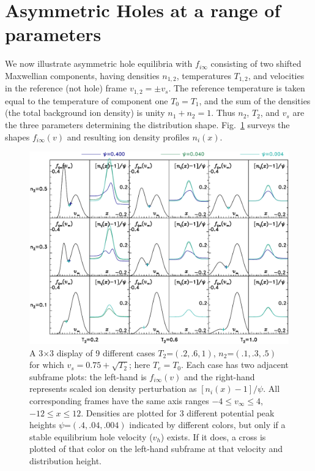 \documentclass[12pt]{article}
\begin{document}
\section{Asymmetric Holes at a range of parameters}

We now illustrate asymmetric hole equilibria with $f_{i\infty}$
consisting of two shifted Maxwellian components, having densities
$n_{1,2}$, temperatures $T_{1,2}$, and velocities in the reference
(not hole) frame $v_{1,2}=\pm v_s$. The reference temperature is taken
equal to the temperature of component one $T_0=T_1$, and the sum of
the densities (the total background ion density) is unity
$n_1+n_2=1$. Thus $n_2$, $T_2$, and $v_s$ are the three parameters
determining the distribution shape. Fig.\ \ref{fig:multiden} surveys
the shapes $f_{i\infty}(v)$ and resulting ion density profiles
$n_i(x)$.
\begin{figure}[htp]
  \centering
  \includegraphics[width=.9\hsize]{multiden}
  \caption{A 3$\times$3 display of 9 different cases
    $T_2$=$(.2,.6,1)$, $n_2$=$(.1,.3,.5)$ for which
    $v_s=0.75+\sqrt{T_2}$; here $T_e=T_0$. Each case has two adjacent
    subframe plots: the left-hand is $f_{i\infty}(v)$ and the
    right-hand represents scaled ion density perturbation as
    $[n_i(x)-1]/\psi$. All corresponding frames have the same axis
    ranges $-4\le v_\infty\le 4$, $-12\le x \le 12$. Densities are
    plotted for 3 different potential peak heights
    $\psi$=$(.4,.04,.004)$ indicated by different colors, but only if
    a stable equilibrium hole velocity ($v_h$) exists. If it does, a
    cross is plotted of that color on the left-hand subframe at that
    velocity and distribution height.}
  \label{fig:multiden}
\end{figure}
\end{document}
